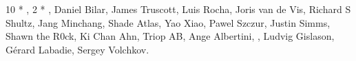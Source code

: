 \subsubsection*{}

10 * , 2 * , Daniel Bilar, James Truscott,
Luis Rocha, Joris van de Vis, Richard S Shultz, Jang Minchang, Shade Atlas, Yao Xiao,
Pawel Szczur, Justin Simms, Shawn the R0ck, Ki Chan Ahn, Triop AB, Ange Albertini,
, Ludvig Gislason, Gérard Labadie, Sergey Volchkov.
